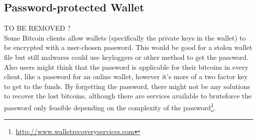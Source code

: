 

\subsection{Password-protected Wallet}
TO BE REMOVED ? \\
Some Bitcoin clients allow wallets (specifically the private keys in the wallet) to be encrypted with a user-chosen password. This would be good for a stolen wallet file but still malwares could use keyloggers or other method to get the password. Also users might think that the password is applicable for their bitcoins in every client, like a password for an online wallet, however it's more of a two factor key to get to the funds. By forgetting the password, there might not be any solutions to recover the lost bitcoins, although there are services available to bruteforce the password only feasible depending on the complexity of the password\footnote{\url {http://www.walletrecoveryservices.com}}.

 


